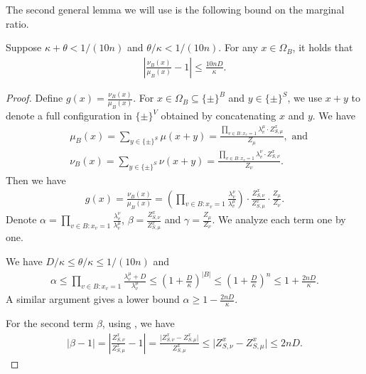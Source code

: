 The second general lemma we will use is the following bound on the marginal ratio.
\begin{lemma}\label{lem:marginal-ratio}
    Suppose $\kappa + \theta < 1/(10n)$ and $\theta/\kappa < 1/(10n)$.
    For any $x \in \Omega_B$, it holds that
    \begin{align*}
        \left\vert\frac{\nu_B(x)}{\mu_B(x)} -1 \right\vert \leq \frac{10n D}{\kappa}.
    \end{align*}
\end{lemma}
\begin{proof}
    Define  $g(x)=\frac{\nu_B(x)}{\mu_B(x)}$. For $x \in \Omega_B \subseteq \{\pm\}^B$ and $y \in \{\pm\}^S$, we use $x + y$ to denote a full configuration in $\{\pm\}^V$ obtained by concatenating $x$ and $y$. We have
    \begin{align*}
        &\mu_B(x)=\sum_{y\in \{\pm\}^{S}}\mu(x+y)=\frac{\prod_{v\in B:x_v=1}\lambda_v^\mu \cdot Z_{S,\mu}^x}{Z_\mu},\text{ and}\\
        &\nu_B(x)=\sum_{y\in \{\pm\}^{S}}\nu(x+y)=\frac{\prod_{v\in B:x_v=1}\lambda_v^\nu \cdot Z_{S,\nu}^x}{Z_\nu}.
    \end{align*}
Then we have
\begin{align*}
    g(x)=\frac{\nu_B(x)}{\mu_B(x)}=\left(\prod_{v\in B:x_v=1} \frac{\lambda_v^\nu}{\lambda_v^\mu} \right) \cdot \frac{Z_{S,\nu}^x}{Z_{S,\mu}^x} \cdot \frac{Z_\mu}{Z_\nu}.
\end{align*}
Denote $\alpha=\prod_{v\in B:x_v=1} \frac{\lambda_v^\nu}{\lambda_v^\mu}$, $\beta=\frac{Z_{S,\nu}^x}{Z_{S,\mu}^x}$ and $\gamma =\frac{Z_\mu}{Z_\nu}$. We analyze each term one by one.

We have ${D}/{\kappa} \leq \theta / \kappa \leq 1/(10n)$ and  
\begin{align*}
    \alpha \leq \prod_{v\in B:x_v=1}\frac{\lambda_v^\mu+D}{\lambda_v^\mu}\leq \left(1+\frac{D}{\kappa}\right)^{|B|}\leq \left(1+\frac{D}{\kappa}\right)^{n}\leq 1+\frac{2nD}{\kappa}.
\end{align*}
A similar argument gives a lower bound $\alpha \geq 1-\frac{2nD}{\kappa}$. 

For the second term $\beta$, using , we have
\begin{align*}
    \vert \beta - 1 \vert = \left\vert \frac{Z_{S,\nu}^x}{Z_{S,\mu}^x} - 1 \right\vert = \frac{\vert Z_{S,\nu}^x-Z_{S,\mu}^x \vert}{Z_{S,\mu}^x} \leq \vert Z_{S,\nu}^x-Z_{S,\mu}^x \vert \leq 2nD.
\end{align*}


\end{proof}
